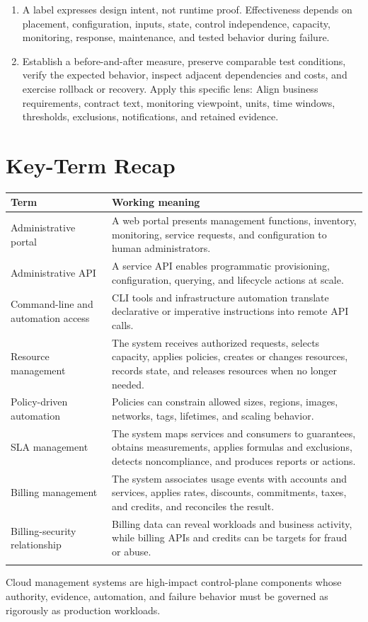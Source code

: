 \documentclass[11pt]{article}
\begin{document}
\begin{enumerate}
\item A label expresses design intent, not runtime proof. Effectiveness depends on placement, configuration, inputs, state, control independence, capacity, monitoring, response, maintenance, and tested behavior during failure.
\item Establish a before-and-after measure, preserve comparable test conditions, verify the expected behavior, inspect adjacent dependencies and costs, and exercise rollback or recovery. Apply this specific lens: Align business requirements, contract text, monitoring viewpoint, units, time windows, thresholds, exclusions, notifications, and retained evidence.
\end{enumerate}
\section{Key-Term Recap}
\begin{longtable}{@{}>{\RaggedRight\arraybackslash}p{}>{\RaggedRight\arraybackslash}p{}@{}}
\toprule\rowcolor{Navy}\color{white}\textbf{Term} & \color{white}\textbf{Working meaning}\\\midrule\endhead
Administrative portal & A web portal presents management functions, inventory, monitoring, service requests, and configuration to human administrators. \\\addlinespace[2pt]
Administrative API & A service API enables programmatic provisioning, configuration, querying, and lifecycle actions at scale. \\\addlinespace[2pt]
Command-line and automation access & CLI tools and infrastructure automation translate declarative or imperative instructions into remote API calls. \\\addlinespace[2pt]
Resource management & The system receives authorized requests, selects capacity, applies policies, creates or changes resources, records state, and releases resources when no longer needed. \\\addlinespace[2pt]
Policy-driven automation & Policies can constrain allowed sizes, regions, images, networks, tags, lifetimes, and scaling behavior. \\\addlinespace[2pt]
SLA management & The system maps services and consumers to guarantees, obtains measurements, applies formulas and exclusions, detects noncompliance, and produces reports or actions. \\\addlinespace[2pt]
Billing management & The system associates usage events with accounts and services, applies rates, discounts, commitments, taxes, and credits, and reconciles the result. \\\addlinespace[2pt]
Billing-security relationship & Billing data can reveal workloads and business activity, while billing APIs and credits can be targets for fraud or abuse. \\\addlinespace[2pt]
\bottomrule
\end{longtable}
\begin{takeawaybox}
Cloud management systems are high-impact control-plane components whose authority, evidence, automation, and failure behavior must be governed as rigorously as production workloads.
\end{takeawaybox}
\end{document}

